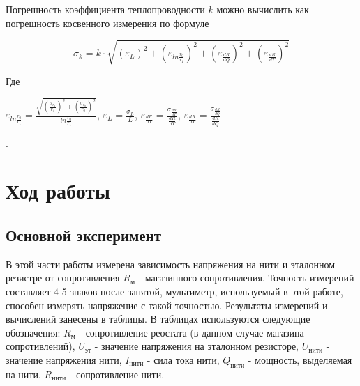 \documentclass[a4paper,14pt]{article}
\begin{document}
Погрешность коэффициента теплопроводности $k$ можно вычислить как погрешность косвенного измерения по формуле \begin{Large} \begin{equation}
\sigma_k = k \cdot \sqrt{\left(\varepsilon_L\right)^2 + \left(\varepsilon_{ln\frac{r_0}{r_1}}\right)^2 + \left(\varepsilon_{\frac{dR}{dQ}}\right)^2 + \left(\varepsilon_{\frac{dR}{dT}}\right)^2}
\end{equation}
\end{Large}
Где \begin{Large} $\varepsilon_{ln\frac{r_0}{r_1}} = \frac{\sqrt{\left(\frac{\sigma_{r_1}}{r_1}\right)^2 + \left(\frac{\sigma_{r_0}}{r_0}\right)^2}}{ln\frac{r_0}{r_1}}$, $\varepsilon_L = \frac{\sigma_L}{L}$, $\varepsilon_{\frac{dR}{dT}} = \frac{\sigma_{\frac{dR}{dT}}}{\frac{dR}{dT}}$, $\varepsilon_{\frac{dR}{dT}} = \frac{\sigma_{\frac{dR}{dQ}}}{\frac{dR}{dQ}}$ \end{Large}. 

\section{Ход работы}
\subsection{Основной эксперимент}
В этой части работы измерена зависимость напряжения на нити и эталонном резистре от сопротивления $R_{\text{м}}$ - магазинного сопротивления. Точность измерений составляет 4-5 знаков после запятой, мультиметр, используемый в этой работе, способен измерять напряжение с такой точностью. Результаты измерений и вычислений занесены в таблицы. В таблицах используются следующие обозначения: $R_{\text{м}}$ - сопротивление реостата (в данном случае магазина сопротивлений), $U_{\text{эт}}$ - значение напряжения на эталонном резисторе, $U_{\text{нити}}$ - значение напряжения нити, $I_{\text{нити}}$ - сила тока нити, $Q_{\text{нити}}$ - мощность, выделяемая на нити, $R_{\text{нити}}$ - сопротивление нити.
\end{document}
